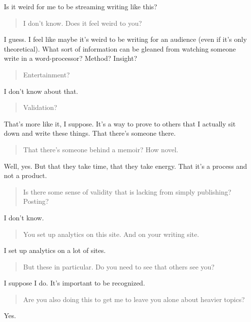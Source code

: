 Is it weird for me to be streaming writing like this?

\begin{quote}
I don't know. Does it feel weird to you?
\end{quote}

I guess. I feel like maybe it's weird to be writing for an audience (even if it's only theoretical). What sort of information can be gleaned from watching someone write in a word-processor? Method? Insight?

\begin{quote}
Entertainment?
\end{quote}

I don't know about that.

\begin{quote}
Validation?
\end{quote}

That's more like it, I suppose. It's a way to prove to others that I actually sit down and write these things. That there's someone there.

\begin{quote}
That there's someone behind a memoir? How novel.
\end{quote}

Well, yes. But that they take time, that they take energy. That it's a process and not a product.

\begin{quote}
Is there some sense of validity that is lacking from simply publishing? Posting?
\end{quote}

I don't know.

\begin{quote}
You set up analytics on this site. And on your writing site.
\end{quote}

I set up analytics on a lot of sites.

\begin{quote}
But these in particular. Do you need to see that others see you?
\end{quote}

I suppose I do. It's important to be recognized.

\begin{quote}
Are you also doing this to get me to leave you alone about heavier topics?
\end{quote}

Yes.
